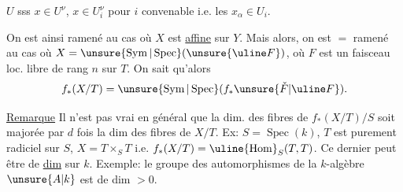 $U$ sss $x\in U^\nu$,   $x\in U_i^\nu$ pour $i$ convenable i.e. les $x_\alpha\in U_i$. 

On est ainsi ramené au cas où $X$ est \uline{affine} sur $Y$. Mais alors, on est $=$ ramené au cas où $X=\unsure{\operatorname{Sym}|\operatorname{Spec}}(\unsure{\uline F})$, où $F$ est un faisceau loc. libre de rang $n$ sur $T$. On sait qu'alors
\[
f_*(X/T)=\unsure{\operatorname{Sym}|\operatorname{Spec}}(f_*\unsure{\check F|\uline F}).
\]


\uline{Remarque} Il n'est pas vrai en général que la dim. des fibres de $f_*(X/T)/S$ soit majorée par $d$ fois la dim des fibres de  $X/T$. Ex:
$S=\operatorname{Spec}(k)$, $T$ est purement radiciel sur $S$, $X=T\times_S T$ i.e. $f_*(X/T)=\uline{\operatorname{Hom}}_S(T,T)$. Ce dernier peut être de \uline{dim}   sur $k$. Exemple: le groupe des automorphismes de la $k$-algèbre $\unsure{A|k}$ est de dim $>0$.
